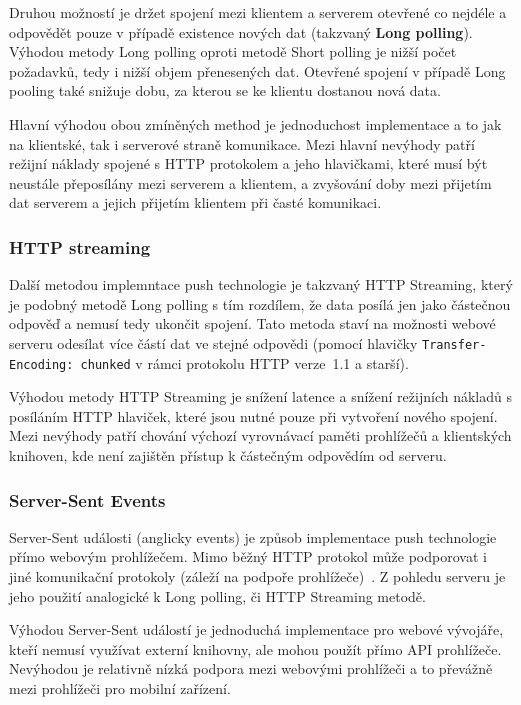 Druhou možností je držet spojení mezi klientem a serverem otevřené co nejdéle a odpovědět pouze v případě existence nových dat (takzvaný \textbf{Long polling}).
Výhodou metody Long polling oproti metodě Short polling je nižší počet požadavků, tedy i nižší objem přenesených dat.
Otevřené spojení v případě Long pooling také snižuje dobu, za kterou se ke klientu dostanou nová data.

Hlavní výhodou obou zmíněných method je jednoduchost implementace a to jak na klientské, tak i serverové straně komunikace.
Mezi hlavní nevýhody patří režijní náklady spojené s \gls{HTTP} protokolem a jeho hlavičkami, které musí být neustále přeposílány mezi serverem a klientem, a zvyšování doby mezi přijetím dat serverem a jejich přijetím klientem při časté komunikaci.~\cite{pushpull:issuesRFC}

\subsubsection{HTTP streaming}

Další metodou implemntace push technologie je takzvaný \gls{HTTP} Streaming, který je podobný metodě Long polling s tím rozdílem, že data posílá jen jako částečnou odpověď a nemusí tedy ukončit spojení.
Tato metoda staví na možnosti webové serveru odesílat více částí dat ve stejné odpovědi (pomocí hlavičky \texttt{Transfer-Encoding: chunked} v rámci protokolu \gls{HTTP} verze~1.1 a starší).

Výhodou metody \gls{HTTP} Streaming je snížení latence a snížení režijních nákladů s posíláním \gls{HTTP} hlaviček, které jsou nutné pouze při vytvoření nového spojení.
Mezi nevýhody patří chování výchozí vyrovnávací paměti prohlížečů a klientských knihoven, kde není zajištěn přístup k částečným odpovědím od serveru.~\cite{pushpull:issuesRFC}

\subsubsection{Server-Sent Events}

Server-Sent události (anglicky events) je způsob implementace push technologie přímo webovým prohlížečem.
Mimo běžný \gls{HTTP} protokol může podporovat i jiné komunikační protokoly (záleží na podpoře prohlížeče)~\cite{pushpull:events}.
Z pohledu serveru je jeho použití analogické k Long polling, či HTTP Streaming metodě.~\cite{pushpull:compare}

Výhodou Server-Sent událostí je jednoduchá implementace pro webové vývojáře, kteří nemusí využívat externí knihovny, ale mohou použít přímo \gls{API} prohlížeče.
Nevýhodou je relativně nízká podpora mezi webovými prohlížeči a to převážně mezi prohlížeči pro mobilní zařízení.~\cite{pushpull:issuesRFC}

